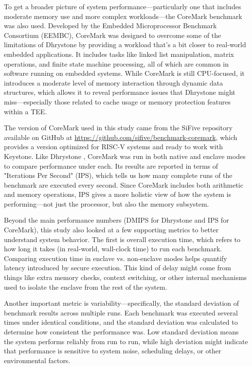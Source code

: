 To get a broader picture of system performance—particularly one that includes moderate memory use and more complex workloads—the CoreMark benchmark \cite{gal2012exploring} was also used. Developed by the Embedded Microprocessor Benchmark Consortium (EEMBC), CoreMark \cite{gal2012exploring} was designed to overcome some of the limitations of Dhrystone by providing a workload that’s a bit closer to real-world embedded applications. It includes tasks like linked list manipulation, matrix operations, and finite state machine processing, all of which are common in software running on embedded systems. While CoreMark \cite{gal2012exploring} is still CPU-focused, it introduces a moderate level of memory interaction through dynamic data structures, which allows it to reveal performance issues that Dhrystone might miss—especially those related to cache usage or memory protection features within a TEE.

The version of CoreMark \cite{gal2012exploring} used in this study came from the SiFive repository available on GitHub at \url{https://github.com/sifive/benchmark-coremark}, which provides a version optimized for RISC-V systems and ready to work with Keystone. Like Dhrystone \cite{weiss2002dhrystone}, CoreMark \cite{gal2012exploring} was run in both native and enclave modes to compare performance under each. Its results are reported in terms of "Iterations Per Second" (IPS), which tells us how many complete runs of the benchmark are executed every second. Since CoreMark includes both arithmetic and memory operations, IPS gives a more holistic view of how the system is performing—not just the processor, but also the memory subsystem.

Beyond the main performance numbers (DMIPS for Dhrystone and IPS for CoreMark), this study also looked at a few supporting metrics to better understand system behavior. The first is overall execution time, which refers to how long it takes (in real-world, wall-clock time) to run each benchmark. Comparing execution time in enclave vs. non-enclave modes helps quantify latency introduced by secure execution. This kind of delay might come from things like extra memory checks, context switching, or other internal mechanisms used to isolate the enclave from the rest of the system.

Another important metric is variability—specifically, the standard deviation of benchmark results across multiple runs. Each benchmark was executed several times under identical conditions, and the standard deviation was calculated to determine how consistent the performance was. Low standard deviation means the system performs reliably from run to run, while high deviation might indicate that performance is sensitive to system noise, scheduling delays, or other environmental factors.

